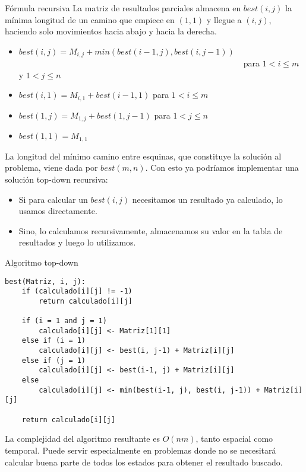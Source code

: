 \documentclass[compress]{beamer}
\begin{document}
\begin{frame}{Fórmula recursiva}
    \small
    La matriz de resultados parciales almacena en $best(i,j)$ la mínima longitud de un camino que empiece en $(1,1)$ y llegue
    a $(i,j)$, haciendo solo movimientos hacia abajo y hacia la derecha.
   \begin{itemize}
   \item $best(i,j) = M_{i,j} + min(best(i-1,j), best(i,j-1))$ \\ \ \ \ \ \ \ \ \ \ \ \ \ \ \ \ \ \ \ \ \ \ \ \ \ \ \ \ \ \ \ \ \ \ \ \ \ \ \ \ \ \ \ \ \ \ \ \ \ \ \ \ \ \ \ para $1 < i \leq m$ y $1 < j \leq n$
   \item $best(i,1) = M_{i,1} + best(i-1,1)$ para $1 < i \leq m$
   \item $best(1,j) = M_{1,j} + best(1,j-1)$ para $1 < j \leq n$
   \item $best(1,1) = M_{1,1}$
  \end{itemize}

\end{frame}
\begin{frame}

    La longitud del mínimo camino entre esquinas, que constituye la solución al problema, viene dada por $best(m,n)$. Con esto ya podríamos implementar una solución top-down recursiva:
    \begin{itemize}
       \item Si para calcular un $best(i,j)$ necesitamos un resultado ya calculado, lo usamos directamente.
       \item Sino, lo calculamos recursivamente, almacenamos su valor en la tabla de resultados y luego lo utilizamos.
    \end{itemize}
     
    
\end{frame}


\begin{frame}[fragile]{Algoritmo top-down}
\footnotesize
\begin{lstlisting}
best(Matriz, i, j):
    if (calculado[i][j] != -1)
        return calculado[i][j]
        
    if (i = 1 and j = 1)
        calculado[i][j] <- Matriz[1][1]
    else if (i = 1)
        calculado[i][j] <- best(i, j-1) + Matriz[i][j]
    else if (j = 1)
        calculado[i][j] <- best(i-1, j) + Matriz[i][j]
    else
        calculado[i][j] <- min(best(i-1, j), best(i, j-1)) + Matriz[i][j]
		
    return calculado[i][j]

\end{lstlisting}

La complejidad del algoritmo resultante es $O(nm)$, tanto espacial como temporal. Puede servir especialmente en problemas donde no se necesitar\'a calcular buena parte de todos los estados para obtener el resultado buscado.
\end{frame}
\end{document}
